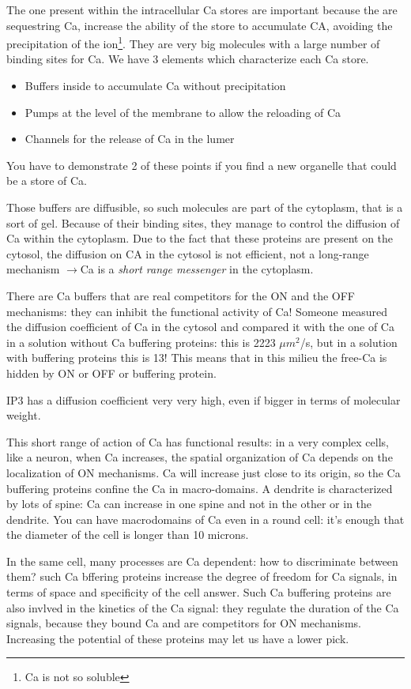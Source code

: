 \documentclass[a4paper, 12pt]{book}
\newcommand{\lfreccia}{\ensuremath{\longrightarrow}}
\begin{document}
The one present within the intracellular Ca stores are important because the are sequestring Ca, increase the ability of the store to accumulate CA, avoiding the precipitation of the ion\footnote{Ca is not so soluble}. They are very big molecules with a large number of binding sites for Ca. We have 3 elements which characterize each Ca store.
\begin{itemize}
\item{Buffers inside to accumulate Ca without precipitation}
\item{Pumps at the level of the membrane to allow the reloading of Ca}
\item{Channels for the release of Ca in the lumer}
\end{itemize}

You have to demonstrate 2 of these points if you find a new organelle that could be a store of Ca.

Those buffers are diffusible, so such molecules are part of the cytoplasm, that is a sort of gel. Because of their binding sites, they manage to control the diffusion of Ca within the cytoplasm. Due to the fact that these proteins are present on the cytosol, the diffusion on CA in the cytosol is not efficient, not a long-range mechanism \lfreccia Ca is a \emph{short range messenger} in the cytoplasm.

There are Ca buffers that are real competitors for the ON and the OFF mechanisms: they can inhibit the functional activity of Ca! Someone measured the diffusion coefficient of Ca in the cytosol and compared it with the one of Ca in a solution without Ca buffering proteins: this is 2223 $\mu m^2$/s, but in a solution with buffering proteins this is 13! This means that in this milieu the free-Ca is hidden by ON or OFF or buffering protein.  

IP3 has a diffusion coefficient very very high, even if bigger in terms of molecular weight.

This short range of action of Ca has functional results:  in a very complex cells, like a neuron, when Ca increases, the spatial organization of Ca depends on the localization of ON mechanisms. Ca will increase just close to its origin, so the Ca buffering proteins confine the Ca in macro-domains. A dendrite is characterized by lots of spine: Ca can increase in one spine and not in the other or in the dendrite. You can have macrodomains of Ca even in a round cell: it's enough that the diameter of the cell is longer than 10 microns.

In the same cell, many processes are Ca dependent: how to discriminate between them? such Ca bffering proteins increase the degree of freedom for Ca signals, in terms of space and specificity of the cell answer. Such Ca buffering proteins are also invlved in the kinetics of the Ca signal: they regulate the duration of the Ca signals, because they bound Ca and are competitors for ON mechanisms. Increasing the potential of these proteins may let us have a lower pick. 
\end{document}
